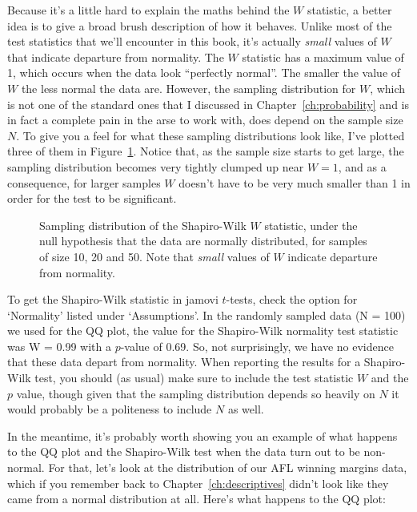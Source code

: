 Because it's a little hard to explain the maths behind the $W$ statistic, a better idea is to give a broad brush description of how it behaves. Unlike most of the test statistics that we'll encounter in this book, it's actually {\it small} values of $W$ that indicate departure from normality. The $W$ statistic has a maximum value of 1, which occurs when the data look ``perfectly normal''. The smaller the value of $W$ the less normal the data are. However, the sampling distribution for $W$, which is not one of the standard ones that I discussed in Chapter~\ref{ch:probability} and is in fact a complete pain in the arse to work with, does depend on the sample size $N$. To give you a feel for what these sampling distributions look like, I've plotted three of them in Figure~\ref{fig:swdist}. Notice that, as the sample size starts to get large, the sampling distribution becomes very tightly clumped up near $W=1$, and as a consequence, for larger samples $W$ doesn't have to be very much smaller than 1 in order for the test to be significant. 

\begin{figure}
\begin{center}
\caption{Sampling distribution of the Shapiro-Wilk $W$ statistic, under the null hypothesis that the data are normally distributed, for samples of size 10, 20 and 50. Note that {\it small} values of $W$ indicate departure from normality.}
\HR
\label{fig:swdist}
\end{center}
\end{figure}

To get the Shapiro-Wilk statistic in jamovi $t$-tests, check the option for `Normality' listed under `Assumptions'. In the randomly sampled data (N = 100) we used for the QQ plot, the value for the Shapiro-Wilk normality test statistic was W = 0.99 with a $p$-value of 0.69. So, not surprisingly, we have no evidence that these data depart from normality. When reporting the results for a Shapiro-Wilk test, you should (as usual) make sure to include the test statistic $W$ and the $p$ value, though given that the sampling distribution depends so heavily on $N$ it would probably be a politeness to include $N$ as well.


In the meantime, it's probably worth showing you an example of what happens to the QQ plot and the Shapiro-Wilk test when the data turn out to be non-normal. For that, let's look at the distribution of our AFL winning margins data, which if you remember back to Chapter~\ref{ch:descriptives} didn't look like they came from a normal distribution at all. Here's what happens to the QQ plot:

